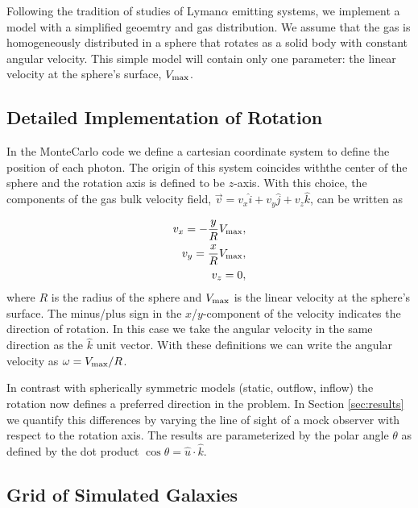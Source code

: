\documentclass[usenatbib]{mn2e}
\begin{document}
Following the tradition of studies of Lyman$\alpha$ emitting systems,
we implement a model with a simplified geoemtry and gas
distribution. We assume that the gas is homogeneously distributed in a
sphere that rotates as a solid body with constant angular
velocity. This simple model will contain only one parameter: the
linear velocity at the sphere's surface, $V_{\rm max}$.

\subsection{Detailed Implementation of Rotation}

 In the MonteCarlo code we define a cartesian coordinate system to
 define the position of each photon. The origin of this system
 coincides withthe center of the sphere and the rotation axis is defined
 to be $z$-axis. With this choice, the components of the gas bulk velocity
 field, $\vec{v} = v_{x}\hat{i} + v_{y}\hat{j} + v_{z}\hat{k}$, can be
 written as  
  
\begin{subequations}
\begin{align}
    v_{x}=-\dfrac{y}{R}V_{\rm max}, \label{subeq1}\\
    v_{y}=\dfrac{x}{R}V_{\rm max}, \label{subeq2}\\
    v_{z}=0, \label{subeq3}
\end{align}
\end{subequations}
%
where $R$ is the radius of the sphere and $V_{\rm max}$ is the linear
velocity at the sphere's surface. The minus/plus sign in the
$x$/$y$-component of the velocity indicates the direction of
rotation. In this case we take the angular velocity in the same
direction as the $\hat{k}$ unit vector. With these definitions we can
write the angular velocity as $\omega=V_{\rm max}/R$.  

In contrast with spherically symmetric models (static, outflow,
inflow) the rotation now defines a preferred direction in the
problem. In Section \ref{sec:results} we quantify this differences by
varying the line of sight of a mock observer with respect to the
rotation axis. The results are parameterized by the polar angle
$\theta$ as defined by the dot product $\cos\theta =
{\hat{u}\cdot\hat{k}}$. 

\subsection{Grid of Simulated Galaxies}
\label{sec:models}
\end{document}
